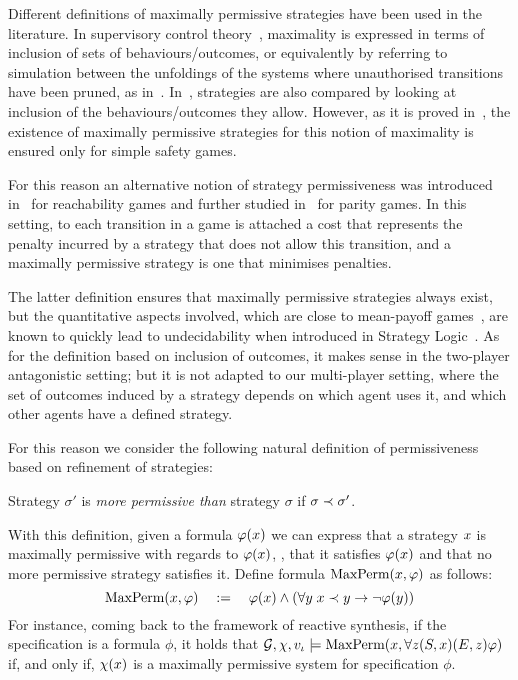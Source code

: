 Different definitions of maximally permissive strategies have been used
in the literature. In supervisory control
theory~\cite{ramadge1987supervisory}, maximality is expressed in terms
of inclusion of sets of behaviours/outcomes, or equivalently by
referring to simulation between the unfoldings of the systems where
unauthorised transitions have been pruned, as
in~\cite{pinchinat2005you}.  In~\cite{bernet2002permissive},
strategies are also compared by looking at inclusion of the behaviours/outcomes they allow. However, as it is proved
in~\cite{bernet2002permissive}, the existence of maximally permissive
strategies for this notion of maximality is ensured only for simple
safety games.

For this reason an alternative notion of strategy
permissiveness was introduced in~\cite{bouyer2009measuring} for
reachability games and further studied in~\cite{bouyer2011measuring}
for parity games. In this setting, to each transition in a game is
attached a cost that represents the penalty incurred by a strategy
that does not allow this transition, and a maximally permissive
strategy is one that minimises penalties.

The latter definition ensures that
maximally permissive strategies always exist, but the quantitative
aspects involved, which are close to mean-payoff
games~\cite{ehrenfeucht1979positional,gurvich1988cyclic}, are known to
quickly lead to undecidability when introduced in Strategy Logic~\cite{gardy2017semantics}.
As for the definition based on inclusion of outcomes, it makes sense in the
two-player antagonistic setting; but it is not adapted to our multi-player setting, where the set of
outcomes induced by a strategy depends on which agent uses it, and
which other agents have a defined strategy.

For this reason we consider the following natural definition of permissiveness based on refinement
of strategies:
\begin{definition}
  \label{def-permissive}
  Strategy $\sigma'$ is \emph{more permissive than} strategy $\sigma$
  if $\sigma\prec\sigma'$. 
\end{definition}

With this definition, given a formula $\varphi(x)$ we can express that a strategy $x$
  is maximally permissive with regards to  $\varphi(x)$, \ie, that
  it satisfies $\varphi(x)$ and that no more permissive strategy
  satisfies it. Define formula $\text{MaxPerm}(x,\varphi)$ as
  follows:
  \[\text{MaxPerm}(x,\varphi) \quad := \quad \varphi(x) \wedge (\forall y \;
    x \prec y \to \neg \varphi(y))\]
  For instance, coming back to the framework of reactive synthesis, if
the specification is a  \CTLs formula $\phi$, it holds that
  $\CGS,\assign,\pos_\init\models \maxperm(\var,\forall \varc
  \bind[S]{\var}\bind[E]{\varc}\phi)$ if, and only
  if, $\chi(x)$ is a maximally permissive system for
  specification $\phi$.

